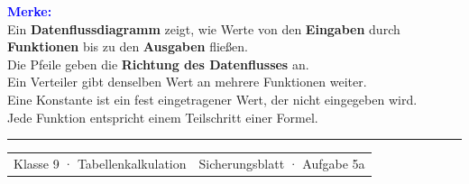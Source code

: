 \documentclass[11pt,a4paper]{article}
\begin{document}
\vspace{7mm}
\colorbox{Mint}{%
  \parbox{\dimexpr\linewidth-2\fboxsep\relax}{%
    \vspace{2.4mm}
    \textcolor{Blue}{\bfseries Merke:}\\[2.4mm]
    Ein \textbf{Datenflussdiagramm} zeigt, wie Werte von den \textbf{Eingaben}
    durch \textbf{Funktionen} bis zu den \textbf{Ausgaben} fließen.\\[2.4mm]
    Die Pfeile geben die \textbf{Richtung des Datenflusses} an.\\[2.4mm]
    Ein Verteiler gibt denselben Wert an mehrere Funktionen weiter.\\[2.4mm]
    Eine Konstante ist ein fest eingetragener Wert, der nicht eingegeben
    wird.\\[2.4mm]
    Jede Funktion entspricht einem Teilschritt einer Formel.
    \vspace{2.4mm}
  }%
}

\vfill
{\color{Line}\rule{\linewidth}{0.5pt}}\par
\vspace{1.5mm}
\begin{tabularx}{\linewidth}{@{}Xr@{}}
  {\small\color{Muted}Klasse 9 · Tabellenkalkulation} &
  {\small\color{Muted}Sicherungsblatt · Aufgabe 5a}
\end{tabularx}
\end{document}
